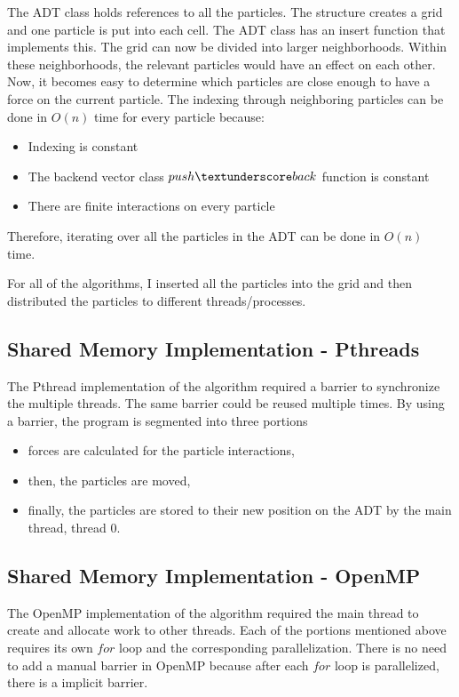 \documentclass[12pt,a4paper]{article}
\begin{document}
The ADT class holds references to all the particles. The structure creates a grid and one particle is put into each cell. The ADT class has an insert function that implements this. The grid can now be divided into larger neighborhoods. Within these neighborhoods, the relevant particles would have an effect on each other. Now, it becomes easy to determine which particles are close enough to have a force on the current particle. The indexing through neighboring particles can be done in $O(n)$ time for every particle because: 
\begin{itemize}
  \item Indexing is constant
  \item The backend vector class $push\textunderscore back$ function is constant
  \item There are finite interactions on every particle
\end{itemize}
Therefore, iterating over all the particles in the ADT can be done in $O(n)$ time. 

For all of the algorithms, I inserted all the particles into the grid and then distributed the particles to different threads/processes.

\subsection{Shared Memory Implementation - Pthreads}

The Pthread implementation of the algorithm required a barrier to synchronize the multiple threads. The same barrier could be reused multiple times. By using a barrier, the program is segmented into three portions
\begin{itemize}
  \item forces are calculated for the particle interactions,
  \item then, the particles are moved,
   \item finally, the particles are stored to their new position on the ADT by the main thread, thread 0.
\end{itemize}

\subsection{Shared Memory Implementation - OpenMP}

The OpenMP implementation of the algorithm required the main thread to create and allocate work to other threads. Each of the portions mentioned above requires its own $for$ loop and the corresponding parallelization. There is no need to add a manual barrier in OpenMP because after each $for$ loop is parallelized, there is a implicit barrier. 
\end{document}
